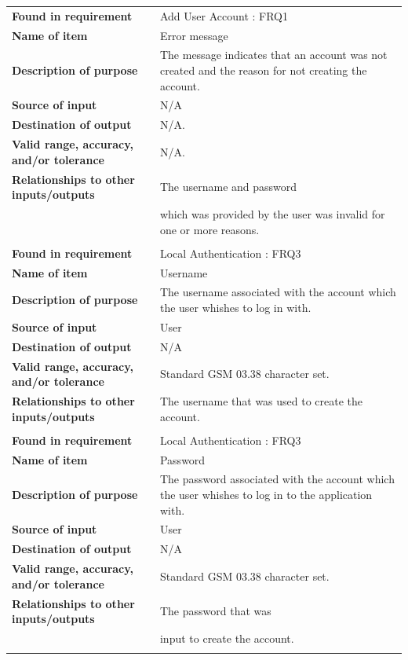 \begin{tabular}{ll}
\textbf{Found in requirement}&Add User Account : FRQ1\\
\textbf{Name of item}&Error message\\
\textbf{Description of purpose}&The message indicates that an account was not created and the reason for not creating the account.\\
\textbf{Source of input}&N/A\\
\textbf{Destination of output}&N/A.\\
\textbf{Valid range, accuracy, and/or tolerance}&N/A.\\
\textbf{Relationships to other inputs/outputs}&The username and password \\&which was provided by the user was invalid for one or more reasons.\\
&\\
\textbf{Found in requirement}&Local Authentication : FRQ3\\
\textbf{Name of item}&Username\\
\textbf{Description of purpose}&The username associated with the account which the user whishes to log in with.\\
\textbf{Source of input}&User\\
\textbf{Destination of output}&N/A\\
\textbf{Valid range, accuracy, and/or tolerance}&Standard GSM 03.38 character set.\\
\textbf{Relationships to other inputs/outputs}&The username that was used to create the account.\\
&\\
\textbf{Found in requirement}&Local Authentication : FRQ3\\
\textbf{Name of item}&Password\\
\textbf{Description of purpose}&The password associated with the account which the user whishes to log in to the application with.\\
\textbf{Source of input}&User\\
\textbf{Destination of output}&N/A\\
\textbf{Valid range, accuracy, and/or tolerance}&Standard GSM 03.38 character set.\\
\textbf{Relationships to other inputs/outputs}&The password that was \\&input to create the account.\\
&\\
\end{tabular}
